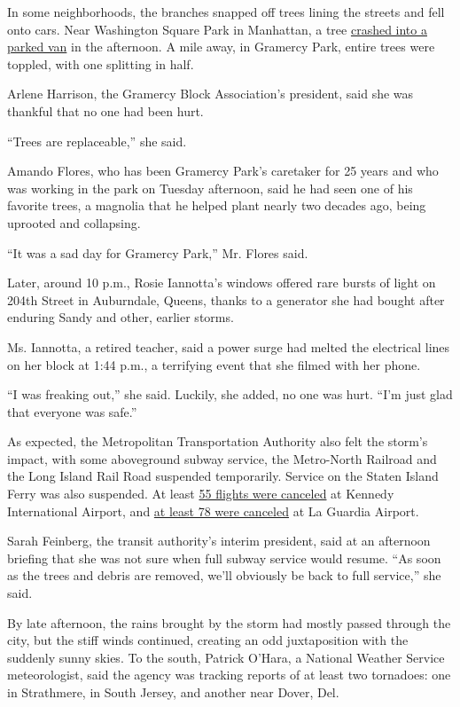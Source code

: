 In some neighborhoods, the branches snapped off trees lining the streets
and fell onto cars. Near Washington Square Park in Manhattan, a tree
\href{https://twitter.com/michelledozois/status/1290733797344935936}{crashed
into a parked van} in the afternoon. A mile away, in Gramercy Park,
entire trees were toppled, with one splitting in half.

Arlene Harrison, the Gramercy Block Association's president, said she
was thankful that no one had been hurt.

``Trees are replaceable,'' she said.

Amando Flores, who has been Gramercy Park's caretaker for 25 years and
who was working in the park on Tuesday afternoon, said he had seen one
of his favorite trees, a magnolia that he helped plant nearly two
decades ago, being uprooted and collapsing.

``It was a sad day for Gramercy Park,'' Mr. Flores said.

Later, around 10 p.m., Rosie Iannotta's windows offered rare bursts of
light on 204th Street in Auburndale, Queens, thanks to a generator she
had bought after enduring Sandy and other, earlier storms.

Ms. Iannotta, a retired teacher, said a power surge had melted the
electrical lines on her block at 1:44 p.m., a terrifying event that she
filmed with her phone.

``I was freaking out,'' she said. Luckily, she added, no one was hurt.
``I'm just glad that everyone was safe.''

As expected, the Metropolitan Transportation Authority also felt the
storm's impact, with some aboveground subway service, the Metro-North
Railroad and the Long Island Rail Road suspended temporarily. Service on
the Staten Island Ferry was also suspended. At least
\href{https://twitter.com/JFKairport/status/1290680225471356929}{55
flights were canceled} at Kennedy International Airport, and
\href{https://twitter.com/LGAairport/status/1290664182904426498}{at
least 78 were canceled} at La Guardia Airport.

Sarah Feinberg, the transit authority's interim president, said at an
afternoon briefing that she was not sure when full subway service would
resume. ``As soon as the trees and debris are removed, we'll obviously
be back to full service,'' she said.

By late afternoon, the rains brought by the storm had mostly passed
through the city, but the stiff winds continued, creating an odd
juxtaposition with the suddenly sunny skies. To the south, Patrick
O'Hara, a National Weather Service meteorologist, said the agency was
tracking reports of at least two tornadoes: one in Strathmere, in South
Jersey, and another near Dover, Del.

